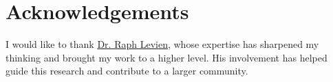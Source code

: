 \section*{Acknowledgements} 
I would like to thank \underline{\href{https://levien.com}{Dr. Raph Levien}}, whose expertise has sharpened my thinking and brought my work to a higher level. His involvement has helped guide this research and contribute to a larger community.
